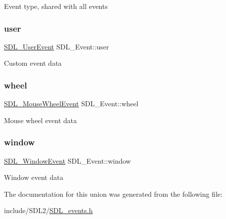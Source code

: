 Event type, shared with all events \mbox{\label{union_s_d_l___event_ab7c394e3ce7bf1e4f8d68bc0e9f1b042}} 
\subsubsection{\texorpdfstring{user}{user}}
{\footnotesize\ttfamily \hyperlink{struct_s_d_l___user_event}{S\+D\+L\+\_\+\+User\+Event} S\+D\+L\+\_\+\+Event\+::user}

Custom event data \mbox{\label{union_s_d_l___event_a267d3f550715519ec90a81ccd0e6cbda}} 
\subsubsection{\texorpdfstring{wheel}{wheel}}
{\footnotesize\ttfamily \hyperlink{struct_s_d_l___mouse_wheel_event}{S\+D\+L\+\_\+\+Mouse\+Wheel\+Event} S\+D\+L\+\_\+\+Event\+::wheel}

Mouse wheel event data \mbox{\label{union_s_d_l___event_a826936b3275406d857bc6654669fae71}} 
\subsubsection{\texorpdfstring{window}{window}}
{\footnotesize\ttfamily \hyperlink{struct_s_d_l___window_event}{S\+D\+L\+\_\+\+Window\+Event} S\+D\+L\+\_\+\+Event\+::window}

Window event data 

The documentation for this union was generated from the following file\+:\begin{DoxyCompactItemize}
\item 
include/\+S\+D\+L2/\hyperlink{_s_d_l__events_8h}{S\+D\+L\+\_\+events.\+h}\end{DoxyCompactItemize}
